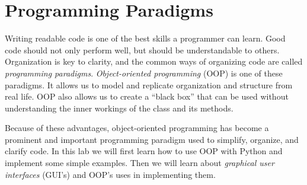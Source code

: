 \label{lab:OOP}

\section*{Programming Paradigms}

Writing readable code is one of the best skills a programmer can learn.
Good code should not only perform well, but should be understandable to others.
Organization is key to clarity, and the common ways of organizing code are called \emph{programming paradigms}.
\emph{Object-oriented programming} (OOP) is one of these paradigms.
It allows us to model and replicate organization and structure from real life.
OOP also allows us to create a ``black box'' that can be used without understanding the inner workings of the class and its methods.

Because of these advantages, object-oriented programming has become a prominent and important programming paradigm used to simplify, organize, and clarify code.
In this lab we will first learn how to use OOP with Python and implement some simple examples.
Then we will learn about \emph{graphical user interfaces} (GUI's) and OOP's uses in implementing them.


\begin{comment}
A way of organizing a program is often called a ``paradigm."

Paradigms are designed to create better code by structuring or organizing the code in a more meaningful way.
Code without any structure is often referred to as ``spaghetti code.''
Spaghetti can be very easy to write, but very difficult to understand or modify.
\emph{Structured programming} emphasizes the use of programming structures to select or repeat the execution of blocks of code.
It is good practice to structure your programs in such a way that they are easy to understand, extend, or reuse.
Making extensive use of procedures (or subfunctions) is a characteristic of \emph{procedural programming}.
The work of the program is done in the subfunctions with one main function supervising the calling of each subfunction.

Another important, albeit specialized, paradigm is \li{object oriented programming} (or OOP).
The concept of object oriented programming is to model a problem as the interaction of a collection of objects.
There are many other paradigms such as declarative, event-driven, and array programming.
\end{comment}



